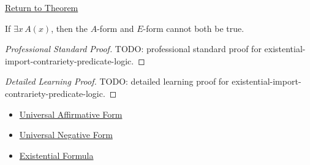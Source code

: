 \newpage
{}
\label{prf:existential-import-contrariety-predicate-logic}

\begin{remark*}[Return]
\hyperref[prop:existential-import-contrariety-predicate-logic]{Return to Theorem}
\end{remark*}

\begin{proposition*}
If \(\exists x\,A(x)\), then the \(A\)-form and \(E\)-form cannot both be true.
\end{proposition*}

\begin{proof}[Professional Standard Proof]
\LRAProofBodyStart
TODO: professional standard proof for existential-import-contrariety-predicate-logic.
\end{proof}

\begin{proof}[Detailed Learning Proof]
\LRAProofBodyStart
TODO: detailed learning proof for existential-import-contrariety-predicate-logic.
\end{proof}

\begin{remark*}
\end{remark*}

\begin{dependencies}
\begin{itemize}
  \item \hyperref[def:categorical-a-form-predicate-logic]{Universal Affirmative Form}
  \item \hyperref[def:categorical-e-form-predicate-logic]{Universal Negative Form}
  \item \hyperref[def:existential-q]{Existential Formula}
\end{itemize}
\end{dependencies}

\clearpage
